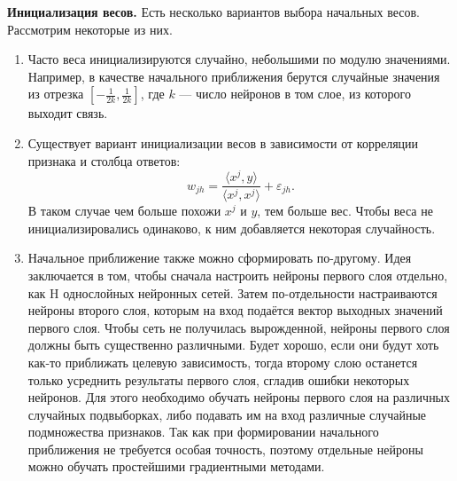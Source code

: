 \documentclass{article}
\begin{document}
	\textbf{Инициализация весов.} 
	Есть несколько вариантов выбора начальных весов. Рассмотрим некоторые из них.
	\begin{enumerate}
		\item Часто веса инициализируются случайно, небольшими по модулю значениями. Например, в качестве начального приближения берутся случайные значения из отрезка $[-\frac{1}{2k}, \frac{1}{2k}]$, где $k$ --- число нейронов в том слое, из которого выходит связь.
		\item Существует вариант инициализации весов в зависимости от корреляции признака и столбца ответов:
		\begin{equation*}
			w_{jh}=\frac{\langle x^j, y\rangle}{\langle x^j, x^j\rangle} + \varepsilon_{jh}.
		\end{equation*}
		В таком случае чем больше похожи $x^j$ и $y$, тем больше вес. Чтобы веса не инициализировались одинаково, к ним добавляется некоторая случайность. 
		
		\item Начальное приближение также можно сформировать по-другому. Идея заключается в том, чтобы сначала настроить нейроны первого слоя отдельно, как H однослойных нейронных сетей. Затем по-отдельности настраиваются нейроны второго слоя, которым на вход подаётся вектор выходных значений первого слоя. Чтобы сеть не получилась вырожденной, нейроны первого слоя должны быть существенно различными. Будет хорошо, если они будут хоть как-то приближать целевую зависимость, тогда второму слою останется только усреднить результаты первого слоя, сгладив ошибки некоторых нейронов. Для этого необходимо обучать нейроны первого слоя на различных случайных подвыборках, либо подавать им на вход различные случайные подмножества признаков. Так как при формировании начального приближения не требуется особая точность, поэтому отдельные нейроны можно обучать простейшими градиентными методами.
		
	\end{enumerate}
	
\end{document}
